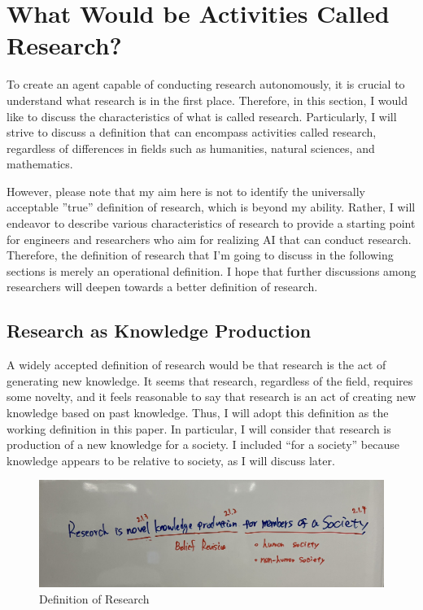 \section{What Would be Activities Called Research?}
\label{chapter-what-is-research}

To create an agent capable of conducting research autonomously, it is crucial to understand what research is in the first place. Therefore, in this section, I would like to discuss the characteristics of what is called research. Particularly, I will strive to discuss a definition that can encompass activities called research, regardless of differences in fields such as humanities, natural sciences, and mathematics.

However, please note that my aim here is not to identify the universally acceptable ''true'' definition of research, which is beyond my ability. Rather, I will endeavor to describe various characteristics of research to  provide a starting point for engineers and researchers who aim for realizing AI that can conduct research. Therefore, the definition of research that I'm going to discuss in the following sections is merely an operational definition. I hope that further discussions among researchers will deepen towards a better definition of research.

\subsection{Research as Knowledge Production}

A widely accepted definition of research would be that research is the act of generating new knowledge. It seems that research, regardless of the field, requires some novelty, and it feels reasonable to say that research is an act of creating new knowledge based on past knowledge. Thus, I will adopt this definition as the working definition in this paper. In particular, I will consider that research is production of a new knowledge for a society. I included ``for a society'' because knowledge appears to be relative to society, as I will discuss later. 


\begin{figure}[htb]
    \centering
    \includegraphics[width=\linewidth]{figs/definition.jpg}
    \caption{Definition of Research}
    \label{fig:definition}
\end{figure}

